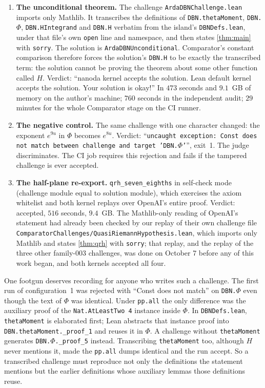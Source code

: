 \documentclass[11pt]{article}
\theoremstyle{definition}
\newcommand{\lean}[1]{\texttt{#1}}
\newcommand{\Hfun}{H}
\begin{document}
\begin{enumerate}[leftmargin=*]
\item \textbf{The unconditional theorem.} The challenge \lean{ArdaDBNChallenge.lean} imports only Mathlib. It transcribes the definitions of \lean{DBN.thetaMoment}, \lean{DBN.$\Phi$}, \lean{DBN.HIntegrand} and \lean{DBN.H} verbatim from the island's \lean{DBNDefs.lean}, under that file's own \lean{open} line and namespace, and then states \cref{thm:main} with \lean{sorry}. The solution is \lean{ArdaDBNUnconditional}. Comparator's constant comparison therefore forces the solution's \lean{DBN.H} to be exactly the transcribed term: the solution cannot be proving the theorem about some other function called $\Hfun$. Verdict: ``nanoda kernel accepts the solution. Lean default kernel accepts the solution. Your solution is okay!'' In $473$ seconds and $9.1$~GB of memory on the author's machine; $760$ seconds in the independent audit; $29$ minutes for the whole Comparator stage on the CI runner.
\item \textbf{The negative control.} The same challenge with one character changed: the exponent $e^{9u}$ in $\Phi$ becomes $e^{8u}$. Verdict: ``\lean{uncaught exception: Const does not match between challenge and target 'DBN.$\Phi$'}'', exit~1. The judge discriminates. The CI job requires this rejection and fails if the tampered challenge is ever accepted.
\item \textbf{The half-plane re-export.} \lean{qrh\_seven\_eighths} in self-check mode (challenge module equal to solution module), which exercises the axiom whitelist and both kernel replays over OpenAI's entire proof. Verdict: accepted, $516$ seconds, $9.4$~GB. The Mathlib-only reading of OpenAI's statement had already been checked by our replay of their own challenge file \lean{ComparatorChallenges/QuasiRiemannHypothesis.lean}, which imports only Mathlib and states \cref{thm:qrh} with \lean{sorry}; that replay, and the replay of the three other family-003 challenges, was done on October 7 before any of this work began, and both kernels accepted all four.
\end{enumerate}

One footgun deserves recording for anyone who writes such a challenge. The first run of configuration~1 was rejected with ``Const does not match'' on \lean{DBN.$\Phi$} even though the text of $\Phi$ was identical. Under \lean{pp.all} the only difference was the auxiliary proof of the \lean{Nat.AtLeastTwo 4} instance inside $\Phi$. In \lean{DBNDefs.lean}, \lean{thetaMoment} is elaborated first; Lean abstracts that instance proof into \lean{DBN.thetaMoment.\_proof\_1} and reuses it in $\Phi$. A challenge without \lean{thetaMoment} generates \lean{DBN.$\Phi$.\_proof\_5} instead. Transcribing \lean{thetaMoment} too, although $\Hfun$ never mentions it, made the \lean{pp.all} dumps identical and the run accept. So a transcribed challenge must reproduce not only the definitions the statement mentions but the earlier definitions whose auxiliary lemmas those definitions reuse.
\end{document}

